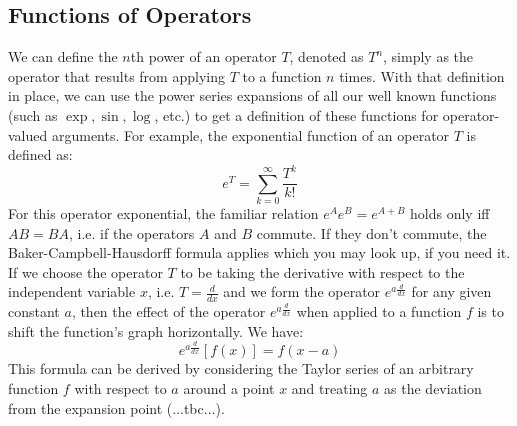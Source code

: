 \subsection{Functions of Operators}
We can define the $n$th power of an operator $T$, denoted as $T^n$, simply as the operator that results from applying $T$ to a function $n$ times. With that definition in place, we can use the power series expansions of all our well known functions (such as $\exp, \sin, \log$, etc.) to get a definition of these functions for operator-valued arguments. For example, the exponential function of an operator $T$ is defined as:
\begin{equation}
  e^T = \sum_{k=0}^{\infty} \frac{T^k}{k!}
\end{equation}
For this operator exponential, the familiar relation $e^A e^B = e^{A + B}$ holds only iff $A B = B A$, i.e. if the operators $A$ and $B$ commute. If they don't commute, the Baker-Campbell-Hausdorff formula applies which you may look up, if you need it. If we choose the operator $T$ to be taking the derivative with respect to the independent variable $x$, i.e. $T = \frac{d}{dx}$ and we form the operator $e^{a \frac{d}{dx}}$ for any given constant $a$, then the effect of the operator $e^{a \frac{d}{dx}}$ when applied to a function $f$ is to shift the function's graph horizontally. We have: 
\begin{equation}
  e^{a \frac{d}{dx}} [f(x)] = f(x-a)
\end{equation}
This formula can be derived by considering the Taylor series of an arbitrary function $f$ with respect to $a$ around a point $x$ and treating $a$ as the deviation from the expansion point (...tbc...).




\begin{comment}
examples: d/dx has eigenpairs (k, e^(kx)), d^2/dx^2 has eigenpairs (-k, sin(kx+p)) for any p

what about a generalization where we allow a scaling of the input, too, such as:
  T(f(x)) = k * f(m*x)
examples of such generalized eigenfunctions would be Gaussians when the operator is the Foruier trafo and we would have m = 1/k (i think)
https://www.facebook.com/groups/mathematikphysik/posts/3391564321076865

https://en.wikipedia.org/wiki/Fourier_transform#Eigenfunctions

\end{comment}


